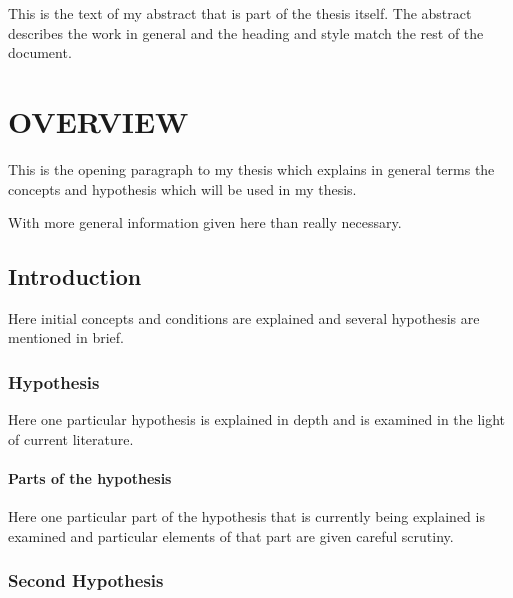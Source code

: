 \documentclass[11pt]{isuthesis}
\begin{document}
\cleardoublepage {}
{}

This is the text of my abstract that is part of the thesis itself.
The abstract describes the work in general and the heading and style
match the rest of the document.

\newpage
{}
\chapter{OVERVIEW}

This is the opening paragraph to my thesis which
explains in general terms the concepts and hypothesis
which will be used in my thesis.

With more general information given here than really
necessary.

\section{Introduction}

Here initial concepts and conditions are explained and
several hypothesis are mentioned in brief.

\subsection{Hypothesis}

Here one particular hypothesis is explained in depth
and is examined in the light of current literature.

\subsubsection{Parts of the hypothesis}

Here one particular part of the hypothesis that is 
currently being explained is examined and particular
elements of that part are given careful scrutiny.


\subsection{Second Hypothesis}
\end{document}
